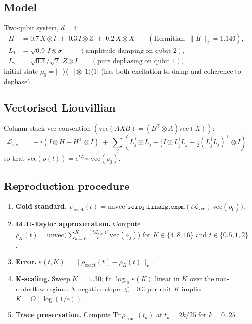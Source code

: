 \documentclass[11pt]{article}
\begin{document}
\subsection{Model}
Two-qubit system, $d=4$:
\begin{align*}
    H &= 0.7\,X\!\otimes\!I \;+\; 0.3\,I\!\otimes\!Z \;+\; 0.2\,X\!\otimes\!X
    \qquad (\text{Hermitian, }\lVert H\rVert_2 = 1.140), \\
    L_1 &= \sqrt{0.9}\,I\!\otimes\!\sigma_-  \qquad (\text{amplitude damping on qubit 2}), \\
    L_2 &= \sqrt{0.3}/\sqrt{2}\,\,Z\!\otimes\!I \qquad (\text{pure dephasing on qubit 1}),
\end{align*}
initial state $\rho_0 = \lvert{+}\rangle\!\langle{+}\rvert \otimes \lvert 1\rangle\!\langle 1\rvert$
(has both excitation to damp and coherence to dephase).

\subsection{Vectorised Liouvillian}
Column-stack vec convention $(\mathrm{vec}(AXB) = (B^\top\!\otimes A)\mathrm{vec}(X))$:
\begin{equation}
    \mathcal L_{\mathrm{vec}} \;=\; -i\!\left(I\!\otimes\!H - H^\top\!\otimes I\right)
      \;+\; \sum_j\!\left(L_j^{*}\!\otimes L_j
        - \tfrac12 I\!\otimes L_j^\dagger L_j
        - \tfrac12 (L_j^\dagger L_j)^\top\!\otimes I\right)
    \label{eq:Lvec}
\end{equation}
so that $\mathrm{vec}(\rho(t)) = e^{t\mathcal L_{\mathrm{vec}}}\,\mathrm{vec}(\rho_0)$.

\subsection{Reproduction procedure}
\begin{enumerate}
    \item \textbf{Gold standard.} $\rho_{\mathrm{exact}}(t) = \mathrm{unvec}\bigl(\texttt{scipy.linalg.expm}(t\mathcal L_{\mathrm{vec}})\,\mathrm{vec}(\rho_0)\bigr)$.
    \item \textbf{LCU-Taylor approximation.} Compute $\rho_K(t)\!=\!\mathrm{unvec}\bigl(\sum_{k=0}^{K}\!\frac{(t\mathcal L_{\mathrm{vec}})^k}{k!}\mathrm{vec}(\rho_0)\bigr)$ for $K\!\in\!\{4,8,16\}$ and $t\!\in\!\{0.5,1,2\}$.
    \item \textbf{Error.} $\varepsilon(t,K) = \lVert \rho_{\mathrm{exact}}(t)-\rho_K(t)\rVert_F$.
    \item \textbf{K-scaling.} Sweep $K=1..30$; fit $\log_{10}\varepsilon(K)$ linear in $K$ over the non-underflow regime. A negative slope $\lesssim -0.3$ per unit $K$ implies $K = O(\log(1/\varepsilon))$.
    \item \textbf{Trace preservation.} Compute $\mathrm{Tr}\,\rho_{\mathrm{exact}}(t_k)$ at $t_k = 2k/25$ for $k=0..25$.
\end{enumerate}
\end{document}
